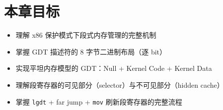 \section{本章目标}

\begin{itemize}
  \item 理解 x86 保护模式下段式内存管理的完整机制
  \item 掌握 GDT 描述符的 8 字节二进制布局（逐 bit）
  \item 实现平坦内存模型的 GDT：Null + Kernel Code + Kernel Data
  \item 理解段寄存器的可见部分（selector）与不可见部分（hidden cache）
  \item 掌握 \texttt{lgdt} + far jump + \texttt{mov} 刷新段寄存器的完整流程
\end{itemize}


